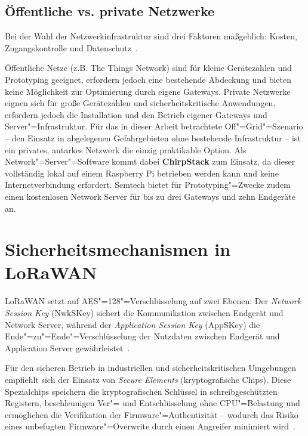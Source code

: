 \subsection{Öffentliche vs. private Netzwerke}
\label{subsec:netzwerktypen}

Bei der Wahl der Netzwerkinfrastruktur sind drei Faktoren maßgeblich: Kosten,
Zugangskontrolle und Datenschutz~\cite{semtech_lora_basics}.

Öffentliche Netze (z.B. The Things Network) sind für kleine Gerätezahlen und
Prototyping geeignet, erfordern jedoch eine bestehende Abdeckung und bieten keine
Möglichkeit zur Optimierung durch eigene Gateways. Private Netzwerke eignen sich
für große Gerätezahlen und sicherheitskritische Anwendungen, erfordern jedoch die
Installation und den Betrieb eigener Gateways und Server"=Infrastruktur. Für das
in dieser Arbeit betrachtete Off"=Grid"=Szenario -- den Einsatz in abgelegenen
Gefahrgebieten ohne bestehende Infrastruktur -- ist ein privates, autarkes Netzwerk
die einzig praktikable Option. Als Network"=Server"=Software kommt dabei \textbf{ChirpStack}
zum Einsatz, da dieser vollständig lokal auf einem Raspberry Pi betrieben werden kann
und keine Internetverbindung erfordert. Semtech bietet für Prototyping"=Zwecke zudem
einen kostenlosen Network Server für bis zu drei Gateways und zehn Endgeräte an.

\section{Sicherheitsmechanismen in LoRaWAN}
\label{sec:sicherheit}

LoRaWAN setzt auf AES"=128"=Verschlüsselung auf zwei Ebenen: Der \textit{Network
Session Key} (NwkSKey) sichert die Kommunikation zwischen Endgerät und Network
Server, während der \textit{Application Session Key} (AppSKey) die Ende"=zu"=Ende"=Verschlüsselung
der Nutzdaten zwischen Endgerät und Application Server gewährleistet~\cite{lorawan_spec}.

Für den sicheren Betrieb in industriellen und sicherheitskritischen Umgebungen empfiehlt
sich der Einsatz von \textit{Secure Elements} (kryptografische Chips). Diese
Spezialchips speichern die kryptografischen Schlüssel in schreibgeschützten Registern,
beschleunigen Ver"= und Entschlüsselung ohne CPU"=Belastung und ermöglichen die
Verifikation der Firmware"=Authentizität -- wodurch das Risiko eines unbefugten %
Firmware"=Overwrite durch einen Angreifer minimiert wird~\cite{semtech_lora_basics}.

